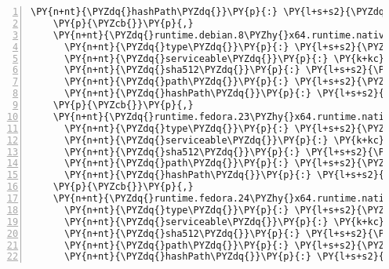 \begin{Verbatim}[commandchars=\\\{\},numbers=left,firstnumber=1,stepnumber=1,numberblanklines=0]
      \PY{n+nt}{\PYZdq{}hashPath\PYZdq{}}\PY{p}{:} \PY{l+s+s2}{\PYZdq{}remotion.linq.2.2.0.nupkg.sha512\PYZdq{}}
    \PY{p}{\PYZcb{}}\PY{p}{,}
    \PY{n+nt}{\PYZdq{}runtime.debian.8\PYZhy{}x64.runtime.native.System.Security.Cryptography.OpenSsl/4.3.0\PYZdq{}}\PY{p}{:} \PY{p}{\PYZob{}}
      \PY{n+nt}{\PYZdq{}type\PYZdq{}}\PY{p}{:} \PY{l+s+s2}{\PYZdq{}package\PYZdq{}}\PY{p}{,}
      \PY{n+nt}{\PYZdq{}serviceable\PYZdq{}}\PY{p}{:} \PY{k+kc}{true}\PY{p}{,}
      \PY{n+nt}{\PYZdq{}sha512\PYZdq{}}\PY{p}{:} \PY{l+s+s2}{\PYZdq{}sha512\PYZhy{}HdSSp5MnJSsg08KMfZThpuLPJpPwE5hBXvHwoKWosyHHfe8Mh5WKT0ylEOf6yNzX6Ngjxe4Whkafh5q7Ymac4Q==\PYZdq{}}\PY{p}{,}
      \PY{n+nt}{\PYZdq{}path\PYZdq{}}\PY{p}{:} \PY{l+s+s2}{\PYZdq{}runtime.debian.8\PYZhy{}x64.runtime.native.system.security.cryptography.openssl/4.3.0\PYZdq{}}\PY{p}{,}
      \PY{n+nt}{\PYZdq{}hashPath\PYZdq{}}\PY{p}{:} \PY{l+s+s2}{\PYZdq{}runtime.debian.8\PYZhy{}x64.runtime.native.system.security.cryptography.openssl.4.3.0.nupkg.sha512\PYZdq{}}
    \PY{p}{\PYZcb{}}\PY{p}{,}
    \PY{n+nt}{\PYZdq{}runtime.fedora.23\PYZhy{}x64.runtime.native.System.Security.Cryptography.OpenSsl/4.3.0\PYZdq{}}\PY{p}{:} \PY{p}{\PYZob{}}
      \PY{n+nt}{\PYZdq{}type\PYZdq{}}\PY{p}{:} \PY{l+s+s2}{\PYZdq{}package\PYZdq{}}\PY{p}{,}
      \PY{n+nt}{\PYZdq{}serviceable\PYZdq{}}\PY{p}{:} \PY{k+kc}{true}\PY{p}{,}
      \PY{n+nt}{\PYZdq{}sha512\PYZdq{}}\PY{p}{:} \PY{l+s+s2}{\PYZdq{}sha512\PYZhy{}+yH1a49wJMy8Zt4yx5RhJrxO/DBDByAiCzNwiETI+1S4mPdCu0OY4djdciC7Vssk0l22wQaDLrXxXkp+3+7bVA==\PYZdq{}}\PY{p}{,}
      \PY{n+nt}{\PYZdq{}path\PYZdq{}}\PY{p}{:} \PY{l+s+s2}{\PYZdq{}runtime.fedora.23\PYZhy{}x64.runtime.native.system.security.cryptography.openssl/4.3.0\PYZdq{}}\PY{p}{,}
      \PY{n+nt}{\PYZdq{}hashPath\PYZdq{}}\PY{p}{:} \PY{l+s+s2}{\PYZdq{}runtime.fedora.23\PYZhy{}x64.runtime.native.system.security.cryptography.openssl.4.3.0.nupkg.sha512\PYZdq{}}
    \PY{p}{\PYZcb{}}\PY{p}{,}
    \PY{n+nt}{\PYZdq{}runtime.fedora.24\PYZhy{}x64.runtime.native.System.Security.Cryptography.OpenSsl/4.3.0\PYZdq{}}\PY{p}{:} \PY{p}{\PYZob{}}
      \PY{n+nt}{\PYZdq{}type\PYZdq{}}\PY{p}{:} \PY{l+s+s2}{\PYZdq{}package\PYZdq{}}\PY{p}{,}
      \PY{n+nt}{\PYZdq{}serviceable\PYZdq{}}\PY{p}{:} \PY{k+kc}{true}\PY{p}{,}
      \PY{n+nt}{\PYZdq{}sha512\PYZdq{}}\PY{p}{:} \PY{l+s+s2}{\PYZdq{}sha512\PYZhy{}c3YNH1GQJbfIPJeCnr4avseugSqPrxwIqzthYyZDN6EuOyNOzq+y2KSUfRcXauya1sF4foESTgwM5e1A8arAKw==\PYZdq{}}\PY{p}{,}
      \PY{n+nt}{\PYZdq{}path\PYZdq{}}\PY{p}{:} \PY{l+s+s2}{\PYZdq{}runtime.fedora.24\PYZhy{}x64.runtime.native.system.security.cryptography.openssl/4.3.0\PYZdq{}}\PY{p}{,}
      \PY{n+nt}{\PYZdq{}hashPath\PYZdq{}}\PY{p}{:} \PY{l+s+s2}{\PYZdq{}runtime.fedora.24\PYZhy{}x64.runtime.native.system.security.cryptography.openssl.4.3.0.nupkg.sha512\PYZdq{}}

\end{Verbatim}

